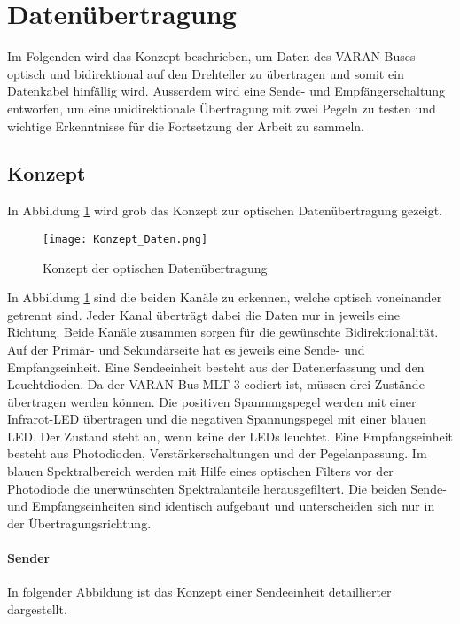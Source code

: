 \section{Datenübertragung}
\label{sec:Daten}
Im Folgenden wird das Konzept beschrieben, um Daten des VARAN-Buses optisch und bidirektional auf den Drehteller zu übertragen und somit ein Datenkabel hinfällig wird. Ausserdem wird eine Sende- und Empfängerschaltung entworfen, um eine unidirektionale Übertragung mit zwei Pegeln zu testen und wichtige Erkenntnisse für die Fortsetzung der Arbeit zu sammeln.  
\subsection{Konzept}
In Abbildung \ref{fig:Konzept_Daten} wird grob das Konzept zur optischen Datenübertragung gezeigt.

\begin{figure}[h]
	\centering
	\texttt{[image: Konzept\_Daten.png]}
	\caption{Konzept der optischen Datenübertragung}\label{fig:Konzept_Daten}
\end{figure}

In Abbildung \ref{fig:Konzept_Daten} sind die beiden Kanäle zu erkennen, welche optisch voneinander getrennt sind. Jeder Kanal überträgt dabei die Daten nur in jeweils eine Richtung. Beide Kanäle zusammen sorgen für die gewünschte Bidirektionalität. Auf der Primär- und Sekundärseite hat es jeweils eine Sende- und Empfangseinheit. Eine Sendeeinheit besteht aus der Datenerfassung und den Leuchtdioden. Da der VARAN-Bus MLT-3 codiert ist, müssen drei Zustände übertragen werden können. Die positiven Spannungspegel werden mit einer Infrarot-LED übertragen und die negativen Spannungspegel mit einer blauen LED. Der Zustand \grqq steht an, wenn keine der LEDs leuchtet.
\newline
Eine Empfangseinheit besteht aus Photodioden, Verstärkerschaltungen und der Pegelanpassung. Im blauen Spektralbereich werden mit Hilfe eines optischen Filters vor der Photodiode die unerwünschten Spektralanteile herausgefiltert.
\newline Die beiden Sende- und Empfangseinheiten sind identisch aufgebaut und unterscheiden sich nur in der Übertragungsrichtung.

\paragraph{Sender}
In folgender Abbildung ist das Konzept einer Sendeeinheit detaillierter dargestellt.

